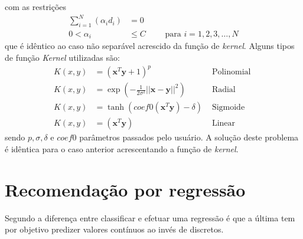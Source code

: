 com as restrições
\begin{align}
\sum\limits_{i=1}^{N} \left( \alpha_{i}d_{i} \right) &= 0 \\
0 < \alpha_{i} &\leq C	\qquad \textrm{ para } i = 1, 2, 3, \ldots, N
\end{align}
que é idêntico ao caso não separável acrescido da função de \emph{kernel}. Alguns tipos de função \emph{Kernel} utilizadas \cite{Haykin2007, Burges1998} são:
\begin{align}
K(x, y) &= (\mathbf{x}^{T}\mathbf{y} + 1)^{p}											&\textrm{ Polinomial } \\
K(x, y) &= \exp \left( -\frac{1}{2\sigma^{2}}||\mathbf{x} - \mathbf{y}||^{2} \right)  	&\textrm{ Radial }	 \\
K(x, y) &= \tanh(coef0(\mathbf{x}^{T}\mathbf{y}) -  \delta)  							&\textrm{ Sigmoide }	 \\
K(x, y) &= (\mathbf{x}^{T}\mathbf{y})													&\textrm{ Linear } 
\end{align}
sendo \(p, \sigma, \delta\) e \(coef0\) parâmetros passados pelo usuário. A solução deste problema é idêntica para o caso anterior acrescentando a função de \emph{kernel}.

\section{Recomendação por regressão}\label{SEC_RECOMENDACAO_REGRESSAO}
Segundo  a diferença entre classificar e efetuar uma regressão é que a última tem por objetivo predizer valores contínuos ao invés de discretos.

